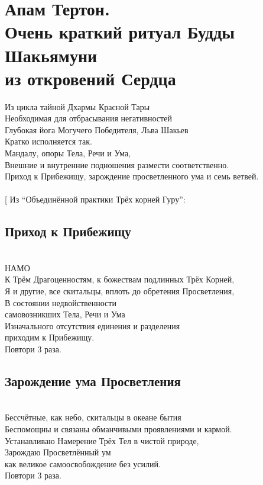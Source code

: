 \section{Апам Тертон.\\Очень краткий ритуал Будды Шакьямуни\\из откровений Сердца}
\scriptsize
Из цикла тайной Дхармы Красной Тары\\
Необходимая для отбрасывания негативностей \\
Глубокая йога Могучего Победителя, Льва Шакьев\\
Кратко исполняется так.\\
Мандалу, опоры Тела, Речи и Ума,\\
Внешние и внутренние подношения размести соответственно.\\
Приход к Прибежищу, зарождение просветленного ума и семь ветвей.\\
\\
\vspace{1cm}
\normalsize
[ \scriptsize Из “Объединённой практики Трёх корней Гуру”: \normalsize
\subsection*{Приход к Прибежищу}
\\

НАМО\\
К Трём Драгоценностям, к божествам подлинных Трёх Корней,\\
Я и другие, все скитальцы, вплоть до обретения Просветления,\\
В состоянии недвойственности \\ \indent самовозникших Тела, Речи и Ума\\
Изначального отсутствия единения и разделения \\ \indent приходим к Прибежищу.\\
\scriptsize
\indent Повтори 3 раза.
\normalsize

\subsection*{Зарождение ума Просветления}
\\
Бессчётные, как небо, скитальцы в океане бытия\\
Беспомощны и связаны обманчивыми проявлениями и кармой.\\
Устанавливаю Намерение Трёх Тел в чистой природе, \\
Зарождаю Просветлённый ум \\ \indent как великое самоосвобождение без усилий. \\
\scriptsize
\indent Повтори 3 раза.\\
\normalsize

